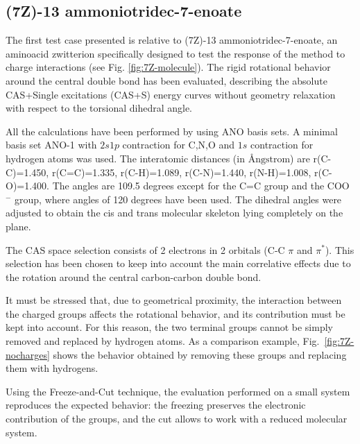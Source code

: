 \subsection{(7Z)-13 ammoniotridec-7-enoate}

The first test case presented is relative to (7Z)-13 ammoniotridec-7-enoate, an
aminoacid zwitterion specifically designed to test the response of the
method to charge interactions (see Fig. \ref{fig:7Z-molecule}). The rigid
rotational behavior around the central double bond has been evaluated,
describing the absolute CAS+Single excitations (CAS+S) energy curves without
geometry relaxation with respect to the torsional dihedral angle. 



All the calculations have been performed by using ANO basis sets.
A minimal basis set ANO-1\cite{tca-77-291-1990} with
$2s1p$ contraction for C,N,O and $1s$ contraction for hydrogen atoms was
used.  The interatomic distances (in $\mbox{{\AA}ngstrom}$) are
r(C-C)=1.450, r(C=C)=1.335, r(C-H)=1.089, r(C-N)=1.440, r(N-H)=1.008,
r(C-O)=1.400. The angles are 109.5 degrees except for the C=C group and the
COO$^{-}$ group, where angles of 120 degrees have been used.
The dihedral angles were adjusted to obtain the cis and trans molecular
skeleton lying completely on the plane.

The CAS space selection consists of 2 electrons in 2 orbitals (C-C $\pi$
and $\pi^{*}$). This selection has been chosen to keep into account the
main correlative effects due to the rotation around the central
carbon-carbon double bond.

It must be stressed that, due to geometrical proximity, the interaction
between the charged groups affects the rotational behavior, and its
contribution must be kept into account.  For this reason, the two terminal groups
cannot be simply removed and replaced by hydrogen atoms.
As a comparison example, Fig.~\ref{fig:7Z-nocharges} shows the
behavior obtained by removing these groups and replacing them with
hydrogens. 



Using the Freeze-and-Cut technique, the evaluation performed on a
small system reproduces the expected behavior: the freezing preserves the
electronic contribution of the groups, and the cut allows to work with a
reduced molecular system.



